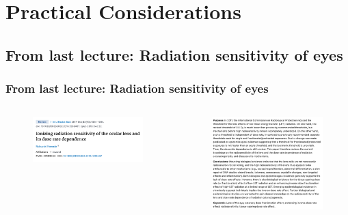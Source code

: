 \subtitle{Computed Tomography - Part 3}
\frame[plain,c]{\titlepage}

\section{Practical Considerations}
\label{sec:ct_considerations}

\subsection{From last lecture: Radiation sensitivity of eyes}

\begin{frame}
    \frametitle{From last lecture: Radiation sensitivity of eyes}
      \begin{columns}
		\begin{column}{0.5\textwidth}
			 \begin{figure}
        			\centering{}
       			 \includegraphics[scale=0.25]{images/hamada_2017_eye_sensitivity_radiation.png}
    			\end{figure}
		\end{column}
			\begin{column}{0.5\textwidth}
			 \begin{figure}
        			\centering{}
       			 \includegraphics[scale=0.25]{images/hamada_2017_abstract.png}
    			\end{figure}
		\end{column}
	\end{columns}
\end{frame}

